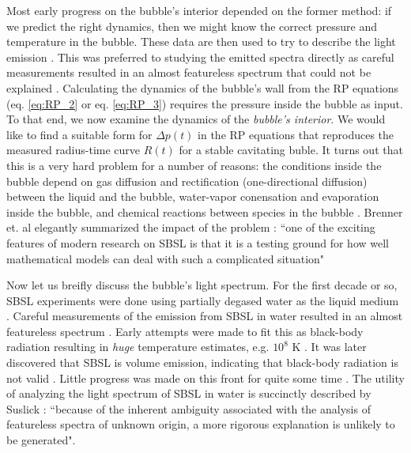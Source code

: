 \documentclass[rmp,aps,nofootinbib,superscriptaddress,floatfix,10pt]{revtex4-2}
\begin{document}
Most early progress on the bubble's interior depended on the former method: if we predict the right dynamics, then we might know the correct pressure and temperature in the bubble. These data are then used to try to describe the light emission \cite{}. This was preferred to studying the emitted spectra directly as careful measurements resulted in an almost featureless spectrum that could not be explained \cite{}. Calculating the dynamics of the bubble's wall from the RP equations (eq. \ref{eq:RP_2} or eq. \ref{eq:RP_3}) requires the pressure inside the bubble as input. To that end, we now examine the dynamics of the \emph{bubble's interior}. We would like to find a suitable form for $\Delta p(t)$ in the RP equations that reproduces the measured radius-time curve $R(t)$ for a stable cavitating buble. It turns out that this is a very hard problem for a number of reasons: the conditions inside the bubble depend on gas diffusion and rectification (one-directional diffusion) between the liquid and the bubble, water-vapor conensation and evaporation inside the bubble, and chemical reactions between species in the bubble \cite{brenner2002single}. Brenner et. al elegantly summarized the impact of the problem \cite{brenner2002single}: ``one of the exciting features of modern research on SBSL is that it is a testing ground for how well mathematical models can deal with such a complicated situation"

Now let us breifly discuss the bubble's light spectrum. For the first decade or so, SBSL experiments were done using partially degased water as the liquid medium \cite{suslick2008inside,brenner2002single,gaitan1992sonoluminescence}. Careful measurements of the emission from SBSL in water resulted in an almost featureless spectrum \cite{}. Early attempts were made to fit this as black-body radiation resulting in \emph{huge} temperature estimates, e.g. $10^8$ K \cite{}. It was later discovered that SBSL is volume emission, indicating that black-body radiation is not valid \cite{}. Little progress was made on this front for quite some time \cite{brenner2002single}. The utility of analyzing the light spectrum of SBSL in water is succinctly described by Suslick \cite{suslick2008inside}: ``because of the inherent ambiguity associated with the analysis of featureless spectra of unknown origin, a more rigorous explanation is unlikely to be generated". 
\end{document}
